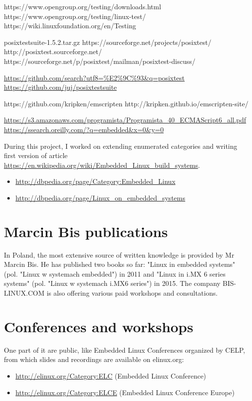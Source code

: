 \documentclass[printmode]{mgr}
\begin{document}
https://www.opengroup.org/testing/downloads.html
https://www.opengroup.org/testing/linux-test/
https://wiki.linuxfoundation.org/en/Testing

posixtestsuite-1.5.2.tar.gz
https://sourceforge.net/projects/posixtest/
http://posixtest.sourceforge.net/
https://sourceforge.net/p/posixtest/mailman/posixtest-discuss/

\url{https://github.com/search?utf8=\%E2\%9C\%93&q=posixtest}
\url{https://github.com/juj/posixtestsuite}

https://github.com/kripken/emscripten
http://kripken.github.io/emscripten-site/

\url{https://s3.amazonaws.com/programista/Programista_40_ECMAScript6_all.pdf}
\url{https://ssearch.oreilly.com/?q=embedded&x=0&y=0}

During this project, I worked on extending enumerated categories and writing first version of article \url{https://en.wikipedia.org/wiki/Embedded_Linux_build_systems}.

\begin{itemize}
  \item \url{http://dbpedia.org/page/Category:Embedded_Linux}
  \item \url{http://dbpedia.org/page/Linux_on_embedded_systems}
\end{itemize}

\section{Marcin Bis publications}

In Poland, the most extensive source of written knowledge is provided by Mr Marcin Bis.
He has published two books so far: "Linux in embedded systems" (pol. "Linux w systemach embedded") in 2011 and "Linux in i.MX 6 series systems" (pol. "Linux w systemach i.MX6 series") in 2015.
The company BIS-LINUX.COM is also offering various paid workshops and consultations.

\section{Conferences and workshops}

One part of it are public, like Embedded Linux Conferences organized by CELP, from which slides and recordings are available on elinux.org:

\begin{itemize}
  \item \url{http://elinux.org/Category:ELC} (Embedded Linux Conference)
  \item \url{http://elinux.org/Category:ELCE} (Embedded Linux Conference Europe)
\end{itemize}
\end{document}
